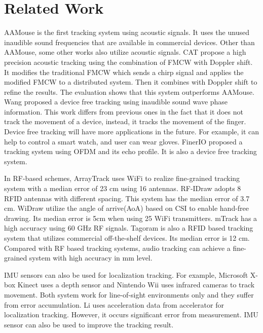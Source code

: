 \documentclass{acm_proc_article-sp}
\begin{document}
\section{Related Work} \label{related_work}
AAMouse is the first tracking system using acoustic signals. It uses
the unused inaudible sound frequencies that are available in commercial 
devices.
Other
than AAMouse, some other works also utilize acoustic signals. 
CAT \cite{Mao:2016:HAM:2973750.2985617} propose a high precision acoustic tracking using the combination of FMCW with Doppler shift.
It modifies the traditional FMCW which sends a chirp signal and 
applies the modified FMCW to a distributed system. Then it combines 
with Doppler shift to refine the results. The evaluation shows that
this system outperforms AAMouse.
Wang \cite{Wang:2016:DGT:2973750.2973764}
proposed a device free tracking using inaudible sound wave phase 
information. This work differs from previous ones in the fact that it
does not track the movement of a device, instead, it tracks the
movement of the finger. Device free tracking will have more
applications in the future. For example, it can help to control a smart watch,
and user can wear gloves.
FinerIO 
\cite{Nandakumar:2016:FUA:2858036.2858580} proposed a tracking system
using OFDM and its echo profile. It is also a device free 
tracking system.

In RF-based schemes, ArrayTrack \cite{Xiong:2013:AFI:2482626.2482635}
uses WiFi to realize fine-grained tracking system with a median error of 23 cm using 16 antennas. RF-IDraw 
\cite{Vasisht:2014:RVT:2645884.2645889} 
adopts 8 RFID antennas with different spacing. This system has the
median error of 3.7 cm. WiDraw \cite{Sun:2015:WEH:2789168.2790129}
utilize the angle of arrive(AoA) based on CSI to enable hand-free
drawing. Its median error is 5cm when using 25 WiFi transmitters.
mTrack \cite{Wei:2015:MHP:2789168.2790113}
has a high accuracy using 60 GHz RF signals.
Tagoram \cite{Yang:2014:TRT:2639108.2639111} 
is also a RFID based tracking system that utilizes
commercial off-the-shelf devices. Its median error is 12 cm.
Compared with RF based tracking systems, audio tracking can achieve
a fine-grained system with high accuracy in mm level.

IMU sensors can also be used for localization tracking. 
For example,
Microsoft X-box Kinect
uses a depth sensor and
Nintendo Wii 
uses infrared cameras to track movement. Both system work for line-of-sight
environments only and they suffer from error accumulation. 
Li \cite{Li:2012:RAI:2370216.2370280}
uses acceleration data from accelerator for localization
tracking. However, it occurs significant error from measurement.
IMU sensor can also be used to improve the tracking result.
\end{document}
